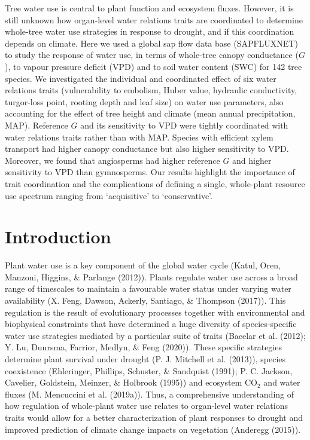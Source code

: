 \documentclass[11pt,twoside]{reedthesis}
\begin{document}
Tree water use is central to plant function and ecosystem fluxes.
However, it is still unknown how organ-level water relations traits are
coordinated to determine whole-tree water use strategies in response to
drought, and if this coordination depends on climate. Here we used a
global sap flow data base (SAPFLUXNET) to study the response of water
use, in terms of whole-tree canopy conductance (\(G\)), to vapour
pressure deficit (VPD) and to soil water content (SWC) for 142 tree
species. We investigated the individual and coordinated effect of six
water relations traits (vulnerability to embolism, Huber value,
hydraulic conductivity, turgor-loss point, rooting depth and leaf size)
on water use parameters, also accounting for the effect of tree height
and climate (mean annual precipitation, MAP). Reference \(G\) and its
sensitivity to VPD were tightly coordinated with water relations traits
rather than with MAP. Species with efficient xylem transport had higher
canopy conductance but also higher sensitivity to VPD. Moreover, we
found that angiosperms had higher reference \(G\) and higher sensitivity
to VPD than gymnosperms. Our results highlight the importance of trait
coordination and the complications of defining a single, whole-plant
resource use spectrum ranging from `acquisitive' to `conservative'.\par
\newpage

\section{Introduction}\label{introduction}

Plant water use is a key component of the global water cycle (Katul,
Oren, Manzoni, Higgins, \& Parlange (2012)). Plants regulate water use
across a broad range of timescales to maintain a favourable water status
under varying water availability (X. Feng, Dawson, Ackerly, Santiago, \&
Thompson (2017)). This regulation is the result of evolutionary
processes together with environmental and biophysical constraints that
have determined a huge diversity of species-specific water use
strategies mediated by a particular suite of traits (Bacelar et al.
(2012); Y. Lu, Duursma, Farrior, Medlyn, \& Feng (2020)). These specific
strategies determine plant survival under drought (P. J. Mitchell et al.
(2013)), species coexistence (Ehleringer, Phillips, Schuster, \&
Sandquist (1991); P. C. Jackson, Cavelier, Goldstein, Meinzer, \&
Holbrook (1995)) and ecosystem \(\text{CO}_2\) and water fluxes (M.
Mencuccini et al. (2019a)). Thus, a comprehensive understanding of how
regulation of whole-plant water use relates to organ-level water
relations traits would allow for a better characterization of plant
responses to drought and improved prediction of climate change impacts
on vegetation (Anderegg (2015)).\par
\end{document}
